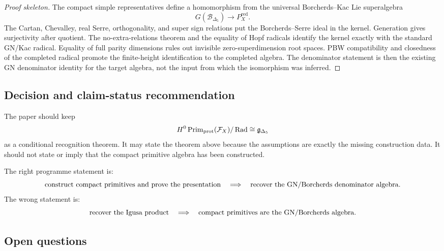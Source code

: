 \begin{proof}[Proof skeleton]
The compact simple representatives define a homomorphism from the
universal Borcherds--Kac Lie superalgebra
\[
G(\mathscr B_{\Delta_5})\longrightarrow P_X^{\mathrm{red}}.
\]
The Cartan, Chevalley, real Serre, orthogonality, and super sign
relations put the Borcherds--Serre ideal in the kernel.  Generation
gives surjectivity after quotient.  The no-extra-relations theorem and
the equality of Hopf radicals identify the kernel exactly with the
standard GN/Kac radical.  Equality of full parity dimensions rules out
invisible zero-superdimension root spaces.  PBW compatibility and
closedness of the completed radical promote the finite-height
identification to the completed algebra.  The denominator statement is
then the existing GN denominator identity for the target algebra, not
the input from which the isomorphism was inferred.
\end{proof}

\subsection{Decision and claim-status recommendation}

The paper should keep
\[
H^0\operatorname{Prim}_{\mathrm{prot}}(\mathcal F_X)/\operatorname{Rad} \cong \mathfrak g_{\Delta_5}
\]
as a conditional recognition theorem.  It may state the theorem above
because the assumptions are exactly the missing construction data.  It
should not state or imply that the compact primitive algebra has been
constructed.

The right programme statement is:
\[
\hbox{construct compact primitives and prove the presentation}
\quad\Longrightarrow\quad
\hbox{recover the GN/Borcherds denominator algebra}.
\]
The wrong statement is:
\[
\hbox{recover the Igusa product}
\quad\Longrightarrow\quad
\hbox{compact primitives are the GN/Borcherds algebra}.
\]

\subsection{Open questions}

